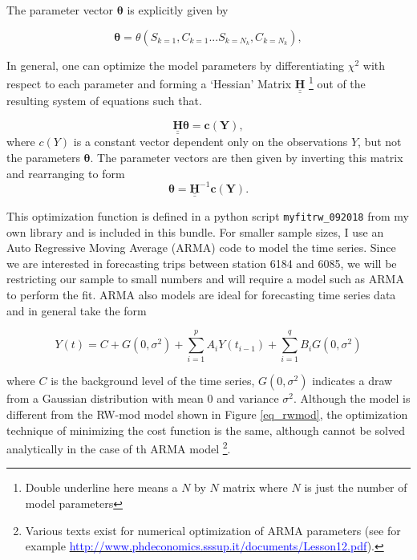 \documentclass[10pt]{article}
\begin{document}
The parameter vector $\mathbf{\theta}$ is explicitly given by

\begin{equation}
\mathbf{\theta} = \theta \left(S_{k=1},C_{k=1} ...S_{k=N_k},C_{k=N_k} \right),
\end{equation}


In general, one can optimize the model parameters by differentiating $\chi^2$ with respect to each parameter and forming a `Hessian' Matrix $\underline{\underline{\mathbf{H}}}$ \footnote{Double underline here means a $N$ by $N$ matrix where $N$ is just the number of model parameters} out of the resulting system of equations such that.

\begin{equation}
\label{eq_hes}
\underline{\underline{\mathbf{H}}} \mathbf{\theta} = \mathbf{c(Y)},
\end{equation}
\noindent where $c(Y)$ is a constant vector dependent only on the observations $Y$, but not the parameters $\mathbf{\theta}$. The parameter vectors are then given by inverting this matrix and rearranging to form 
\begin{equation}
\label{eq_hespars}
\mathbf{\theta} = \underline{\underline{\mathbf{H}}}^{-1} \mathbf{c(Y)}.
\end{equation}


This optimization function is defined in a python script \verb|myfitrw_092018| from my own library and is included in this bundle. For smaller sample sizes, I use an Auto Regressive Moving Average (ARMA) code to model the time series. Since we are interested in forecasting trips between station 6184 and 6085, we will be restricting our sample to small numbers and will require a model such as ARMA to perform the fit. ARMA also models are ideal for forecasting time series data and in general take the form

\begin{equation}
\label{eq_arma}
Y(t) = C + G(0,\sigma^2) + \sum_{i=1}^{p} A_i Y(t_{i-1}) + \sum_{i=1}^{q} B_i G(0,\sigma^2)
\end{equation}


\noindent where $C$ is the background level of the time series, $G(0,\sigma^2)$ indicates a draw from a Gaussian distribution with mean $0$ and variance $\sigma^2$. Although the model is different from the RW-mod model shown in Figure \ref{eq_rwmod}, the optimization technique of minimizing the cost function is the same, although cannot be solved analytically in the case of th ARMA model \footnote{Various texts exist for numerical optimization of ARMA  parameters (see for example \href{ http://www.phdeconomics.sssup.it/documents/Lesson12.pdf}{\textcolor{blue}{http://www.phdeconomics.sssup.it/documents/Lesson12.pdf}}).}.
\end{document}
